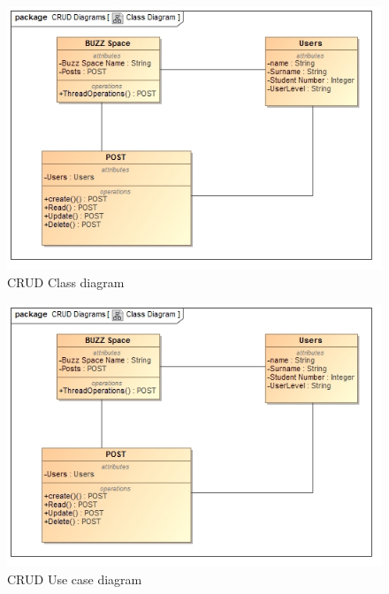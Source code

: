 \documentclass[11pt]{article}
\begin{document}
\begin{enumerate}
\graphicspath{ {../Diagrams/Kyhle/Class_Diagrams/} }	
	\begin{figure}[H]	
		\begin{center}
			\includegraphics[scale=0.5]{CRUD.jpg}
		\end{center}
    	\caption{CRUD Class diagram}
	\end{figure}
		
\graphicspath{ {../Diagrams/Kyhle/Use_Case_Diagrams/} }	
	\begin{figure}[H]	
		\begin{center}
			\includegraphics[scale=0.5]{CRUD.jpg}
		\end{center}
    	\caption{CRUD Use case diagram}
	\end{figure}
	

\end{enumerate}
\end{document}
